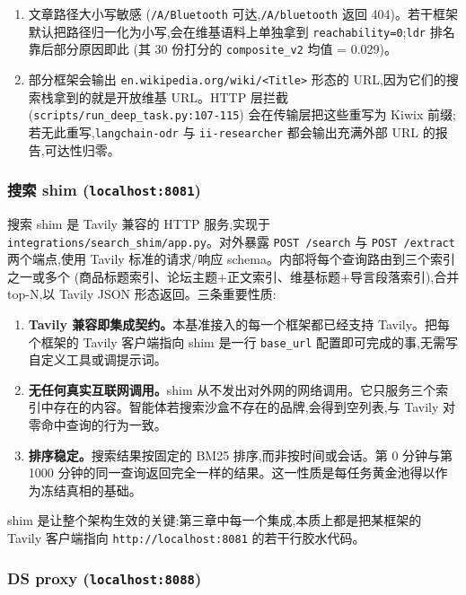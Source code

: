 \documentclass[UTF8,a4paper,12pt,oneside]{ctexart}
\begin{document}
\begin{enumerate}[leftmargin=2em]
\item 文章路径大小写敏感 (\texttt{/A/Bluetooth} 可达,\texttt{/A/bluetooth} 返回 404)。若干框架默认把路径归一化为小写,会在维基语料上单独拿到 \texttt{reachability=0};\texttt{ldr} 排名靠后部分原因即此 (其 30 份打分的 \texttt{composite\_v2} 均值 = 0.029)。
\item 部分框架会输出 \texttt{en.wikipedia.org/wiki/<Title>} 形态的 URL,因为它们的搜索栈拿到的就是开放维基 URL。HTTP 层拦截 (\texttt{scripts/run\_deep\_task.py:107-115}) 会在传输层把这些重写为 Kiwix 前缀;若无此重写,\texttt{langchain-odr} 与 \texttt{ii-researcher} 都会输出充满外部 URL 的报告,可达性归零。
\end{enumerate}

\subsubsection{搜索 shim (\texttt{localhost:8081})}

搜索 shim 是 Tavily 兼容的 HTTP 服务,实现于 \texttt{integrations/search\_shim/app.py}。对外暴露 \texttt{POST /search} 与 \texttt{POST /extract} 两个端点,使用 Tavily 标准的请求/响应 schema。内部将每个查询路由到三个索引之一或多个 (商品标题索引、论坛主题+正文索引、维基标题+导言段落索引),合并 top-N,以 Tavily JSON 形态返回。三条重要性质:

\begin{enumerate}[leftmargin=2em]
\item \textbf{Tavily 兼容即集成契约。}本基准接入的每一个框架都已经支持 Tavily。把每个框架的 Tavily 客户端指向 shim 是一行 \texttt{base\_url} 配置即可完成的事,无需写自定义工具或调提示词。
\item \textbf{无任何真实互联网调用。}shim 从不发出对外网的网络调用。它只服务三个索引中存在的内容。智能体若搜索沙盒不存在的品牌,会得到空列表,与 Tavily 对零命中查询的行为一致。
\item \textbf{排序稳定。}搜索结果按固定的 BM25 排序,而非按时间或会话。第 0 分钟与第 1000 分钟的同一查询返回完全一样的结果。这一性质是每任务黄金池得以作为冻结真相的基础。
\end{enumerate}

shim 是让整个架构生效的关键:第三章中每一个集成,本质上都是把某框架的 Tavily 客户端指向 \texttt{http://localhost:8081} 的若干行胶水代码。

\subsubsection{DS proxy (\texttt{localhost:8088})}
\end{document}
